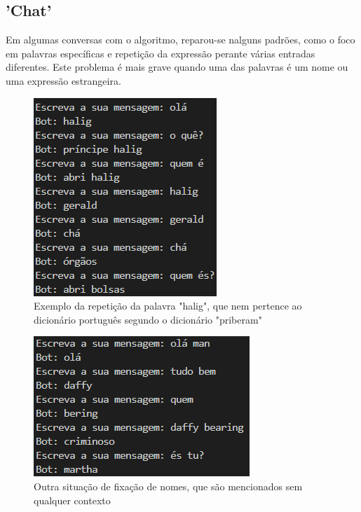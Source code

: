 \documentclass{article}
\begin{document}
\subsection{'Chat'}
Em algumas conversas com o algoritmo, reparou-se nalguns padrões, como o foco em palavras específicas e repetição da expressão perante várias entradas diferentes. Este problema é mais grave quando uma das palavras é um nome ou uma expressão estrangeira. 
\begin{figure}[h]
    \centering
    \includegraphics[scale=0.7]{exemplo_chat.png}
    \caption{Exemplo da repetição da palavra "halig", que nem pertence ao dicionário português segundo o dicionário "priberam"}
    \label{chat1}
\end{figure}
\begin{figure}[h]
    \centering
    \includegraphics[scale=0.7]{chat1}
    \caption{Outra situação de fixação de nomes, que são mencionados sem qualquer contexto}
    \label{chat2}
\end{figure}
\end{document}
